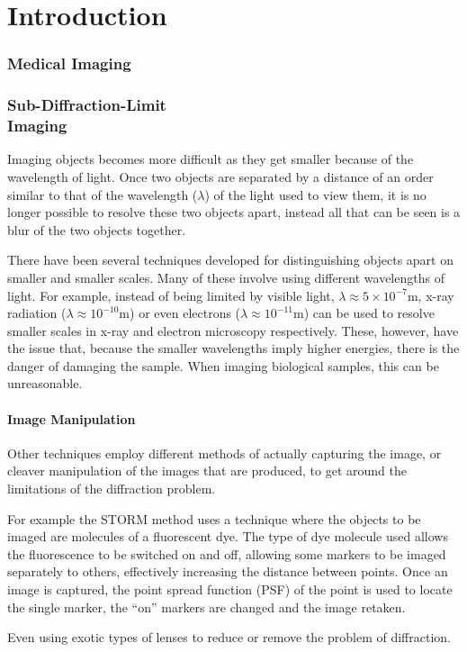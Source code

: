 \part{Introduction}

\section{Medical Imaging}
\label{sec:section_name}

\section[Sub-Diffraction-Limit Imaging]{Sub-Diffraction-Limit\\ Imaging}
\label{sec:sub_diffraction_limit_imaging}

Imaging objects becomes more difficult as they get smaller because of the
wavelength of light. Once two objects are separated by a distance of an order
similar to that of the wavelength ($\lambda$) of the light used to view them,
it is no longer possible to resolve these two objects apart, instead all that
can be seen is a blur of the two objects together.

There have been several techniques developed for distinguishing objects apart
on smaller and smaller scales. Many of these involve using different
wavelengths of light.  For example, instead of being limited by visible light,
$\lambda \approx 5\times 10^{-7} \textrm{m}$, x-ray radiation ($\lambda \approx
10^{-10} \textrm{m}$) or even electrons ($\lambda \approx 10^{-11} \textrm{m}$)
can be used to resolve smaller scales in x-ray and electron microscopy
respectively. These, however, have the issue that, because the smaller
wavelengths imply higher energies, there is the danger of damaging the sample.
When imaging biological samples, this can be unreasonable.

\subsection{Image Manipulation}
\label{sub:image_manipulation}

Other techniques employ different methods of actually capturing the image, or
cleaver manipulation of the images that are produced, to get around the
limitations of the diffraction problem.

For example the STORM method\cite{rust2006sub} uses a technique where the
objects to be imaged are molecules of a fluorescent dye. The type of dye
molecule used allows the fluorescence to be switched on and off, allowing some
markers to be imaged separately to others, effectively increasing the distance
between points. Once an image is captured, the point spread function (PSF) of
the point is used to locate the single marker, the ``on'' markers are changed
and the image retaken.

Even using exotic types of lenses to reduce or remove the problem of
diffraction\cite{fang2005sub}.
